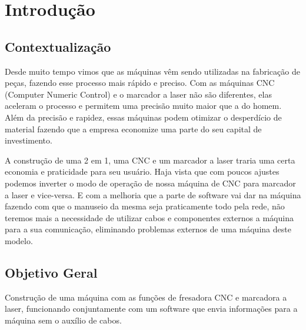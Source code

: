 \section{Introdução}
\subsection{Contextualização}
    Desde muito tempo vimos que as máquinas vêm sendo utilizadas na fabricação de peças, 
fazendo esse processo mais rápido e preciso. Com as máquinas CNC (Computer Numeric Control) 
e o marcador a laser não são diferentes, elas aceleram o processo e permitem uma precisão muito maior que a do homem. 
Além da precisão e rapidez, essas máquinas podem otimizar o desperdício de material fazendo que a empresa economize uma 
parte do seu capital de investimento.

A construção de uma 2 em 1, uma CNC e um marcador a laser traria uma certa economia e praticidade para seu usuário. Haja vista que com poucos ajustes podemos inverter o modo de operação de nossa máquina de CNC para marcador a laser e vice-versa. E com a melhoria que a parte de software vai dar na máquina fazendo com que o manuseio da mesma seja praticamente todo pela rede, não teremos mais a necessidade de utilizar cabos e componentes externos a máquina para a sua comunicação, eliminando problemas externos de uma máquina deste modelo.

\subsection{Objetivo Geral}
Construção de uma máquina com as funções de fresadora CNC e marcadora a laser, funcionando 
conjuntamente com um software que envia informações para a máquina sem o auxílio de cabos.



